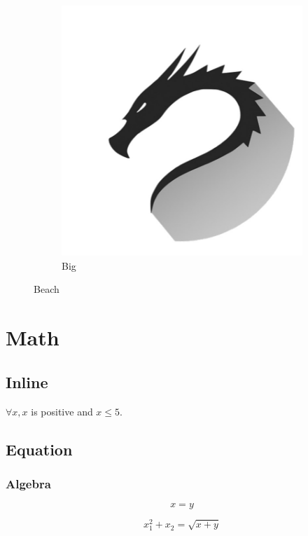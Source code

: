 \documentclass[a4paper, 12pt]{article}
\begin{document}
\begin{figure}[h]
\begin{subfigure}[b]{0.6\textwidth}
			\includegraphics[width=\textwidth]{star.png}
			\caption{Big}
		\end{subfigure}
		\caption{Beach}	
	\end{figure}
	\section{Math}
	
	\subsection{Inline}
		$\forall x, x$ is positive and  $x \leq 5$.
	\subsection{Equation}
	
	\subsubsection{Algebra}
		\begin{equation}
			x = y
		\end{equation}
		
		\begin{equation*}
			x_1^2 + x_2 = \sqrt{x+y}
		\end{equation*}
		
\end{document}
